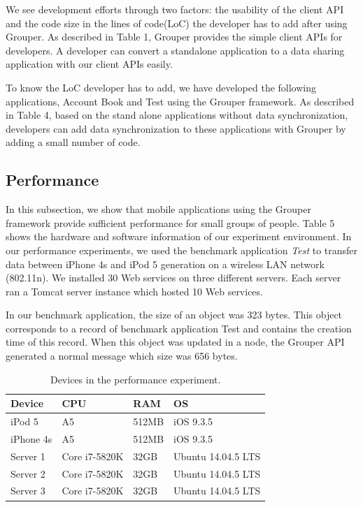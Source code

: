 \documentclass[twocolumn,10pt]{article}
\begin{document}
We see development efforts through two factors: the usability of the client API and the code size in the lines of code(LoC) the developer has to add after using Grouper. 
As described in Table 1, Grouper provides the simple client APIs for developers.
A developer can convert a standalone application to a data sharing application with our client APIs easily.

To know the LoC developer has to add, we have developed the following applications, Account Book and Test using the Grouper framework.
As described in Table 4, based on the stand alone applications without data synchronization, developers can add data synchronization to these applications with Grouper by adding a small number of code. 

\subsection{Performance}

In this subsection, we show that mobile applications using the Grouper framework provide sufficient performance for small groups of people.
Table 5 shows the hardware and software information of our experiment environment.
In our performance experiments, we used the benchmark application \emph{Test} to transfer data between iPhone 4s and iPod 5 generation on a wireless LAN network (802.11n).
We installed 30 Web services on three different servers.
Each server ran a Tomcat server instance which hosted 10 Web services.

In our benchmark application, the size of an object was 323 bytes.
This object corresponds to a record of benchmark application Test and contains the creation time of this record.
When this object was updated in a node, the Grouper API generated a normal message which size was 656 bytes.

\begin{table}[t]
	\footnotesize
	\centering  
	\caption{Devices in the performance experiment.}
	\label{my-label}
	\begin{tabular}{llll}
		\hline
		\textbf{Device} & \textbf{CPU} & \textbf{RAM} & \textbf{OS} \\ \hline
		iPod 5 & A5 & 512MB & iOS 9.3.5 \\
		iPhone 4s & A5 & 512MB & iOS 9.3.5 \\
		Server 1 & Core i7-5820K & 32GB & Ubuntu 14.04.5 LTS \\
		Server 2 & Core i7-5820K & 32GB & Ubuntu 14.04.5 LTS \\
		Server 3 & Core i7-5820K & 32GB & Ubuntu 14.04.5 LTS \\ \hline
	\end{tabular}
\end{table}
\end{document}
